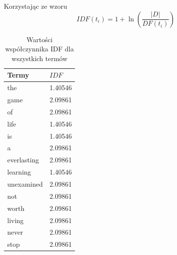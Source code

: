         Korzystając ze wzoru
        \begin{equation}
            IDF(t_i) = 1+\ln{\left(\frac{|D|}{DF(t_i)}\right)}
        \end{equation}
        \begin{table}[h!]
            \centering
            \caption{Wartości współczynnika IDF dla wszystkich termów}
            \label{idf}
            \begin{tabular}{|l|l|}
            \hline
            Termy       & $IDF$     \\ \hline
            the         & 1.40546 \\ \hline
            game        & 2.09861 \\ \hline
            of          & 2.09861 \\ \hline
            life        & 1.40546 \\ \hline
            is          & 1.40546 \\ \hline
            a           & 2.09861 \\ \hline
            everlasting & 2.09861 \\ \hline
            learning    & 1.40546 \\ \hline
            unexamined  & 2.09861 \\ \hline
            not         & 2.09861 \\ \hline
            worth       & 2.09861 \\ \hline
            living      & 2.09861 \\ \hline
            never       & 2.09861 \\ \hline
            stop        & 2.09861 \\ \hline
            \end{tabular}
        \end{table}
        
